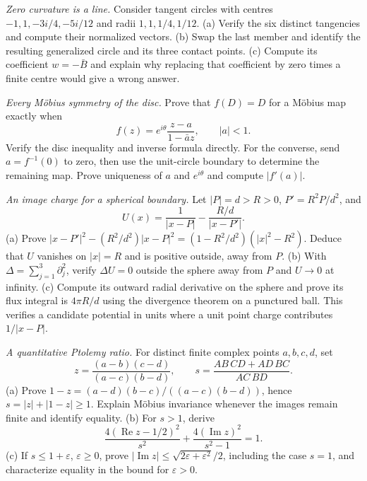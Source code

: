 \begin{exercise}[$\star\star$]\label{ex:v9-descartes-line}
\emph{Zero curvature is a line.} Consider tangent circles with centres $-1,1,-3i/4,-5i/12$ and radii $1,1,1/4,1/12$. (a) Verify the six distinct tangencies and compute their normalized vectors. (b) Swap the last member and identify the resulting generalized circle and its three contact points. (c) Compute its coefficient $w=-\bar B$ and explain why replacing that coefficient by zero times a finite centre would give a wrong answer.
\end{exercise}
\begin{exercise}[$\star\star$]\label{ex:v9-disc-mobius}
\emph{Every M\"obius symmetry of the disc.} Prove that $f(D)=D$ for a M\"obius map exactly when
\[
f(z)=e^{i\theta}\frac{z-a}{1-\bar az},\qquad |a|<1.
\]
Verify the disc inequality and inverse formula directly. For the converse, send $a=f^{-1}(0)$ to zero, then use the unit-circle boundary to determine the remaining map. Prove uniqueness of $a$ and $e^{i\theta}$ and compute $|f'(a)|$.
\end{exercise}
\begin{exercise}[$\star\star\star$]\label{ex:v9-sphere-image-charge}
\emph{An image charge for a spherical boundary.} Let $|P|=d>R>0$, $P'=R^2P/d^2$, and
\[
U(x)=\frac1{|x-P|}-\frac{R/d}{|x-P'|}.
\]
(a) Prove $|x-P'|^2-(R^2/d^2)|x-P|^2=(1-R^2/d^2)(|x|^2-R^2)$. Deduce that $U$ vanishes on $|x|=R$ and is positive outside, away from $P$. (b) With $\Delta=\sum_{j=1}^3\partial_j^2$, verify $\Delta U=0$ outside the sphere away from $P$ and $U\to0$ at infinity. (c) Compute its outward radial derivative on the sphere and prove its flux integral is $4\pi R/d$ using the divergence theorem on a punctured ball. This verifies a candidate potential in units where a unit point charge contributes $1/|x-P|$.
\end{exercise}
\begin{exercise}[$\star\star$]\label{ex:v9-ptolemy-defect}
\emph{A quantitative Ptolemy ratio.} For distinct finite complex points $a,b,c,d$, set
\[
z=\frac{(a-b)(c-d)}{(a-c)(b-d)},\qquad
s=\frac{AB\,CD+AD\,BC}{AC\,BD}.
\]
(a) Prove $1-z=(a-d)(b-c)/((a-c)(b-d))$, hence $s=|z|+|1-z|\ge1$. Explain M\"obius invariance whenever the images remain finite and identify equality. (b) For $s>1$, derive
\[
\frac{4(\operatorname{Re}z-1/2)^2}{s^2}
+\frac{4(\operatorname{Im}z)^2}{s^2-1}=1.
\]
(c) If $s\le1+\varepsilon$, $\varepsilon\ge0$, prove $|\operatorname{Im}z|\le\sqrt{2\varepsilon+\varepsilon^2}/2$, including the case $s=1$, and characterize equality in the bound for $\varepsilon>0$.
\end{exercise}

